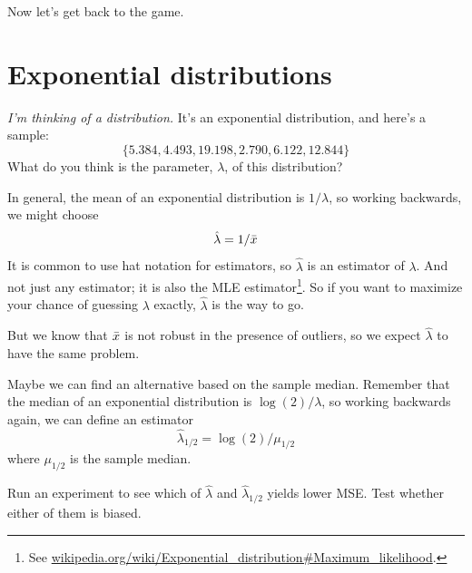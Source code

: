 \documentclass[12pt]{book}
\begin{document}
Now let's get back to the game.


\section{Exponential distributions}

{\em I'm thinking of a distribution.}  It's an exponential distribution, and 
here's a sample:
%
\[ \{ 5.384, 4.493, 19.198, 2.790, 6.122, 12.844 \} \]
%
What do you think is the parameter, $\lambda$, of this distribution?


\newcommand{\lamhat}{\hat{\lambda}}
\newcommand{\lamhatmed}{\hat{\lambda}_{1/2}}

In general, the mean of an exponential distribution is $1 / \lambda$,
so working backwards, we might choose
%
\[ \lamhat = 1 / \xbar \]
%
It is common to use hat notation for estimators, so $\lamhat$ is an
estimator of $\lambda$.  And not just any estimator; it is also the
MLE estimator\footnote{See
\url{wikipedia.org/wiki/Exponential_distribution\#Maximum_likelihood}.}.
So if you want to maximize your chance of guessing $\lambda$ exactly,
$\lamhat$ is the way to go.


But we know that $\bar{x}$ is not robust in the presence of outliers, so
we expect $\lamhat$ to have the same problem.


Maybe we can find an alternative based on the sample median.  Remember
that the median of an exponential distribution is $\log(2) / \lambda$,
so working backwards again, we can define an estimator
%
\[ \lamhatmed = \log(2) / \mu_{1/2} \]
%
where $\mu_{1/2}$ is the sample median.


\begin{exercise}
Run an experiment to see which of $\lamhat$ and $\lamhatmed$ yields
lower MSE.  Test whether either of them is biased.



\end{exercise}
\end{document}
